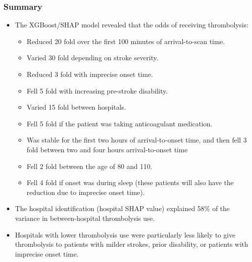 
\begin{frame}
\frametitle{Summary}
\small

\begin{itemize}
    \item The XGBoost/SHAP model revealed that the odds of receiving thrombolysis:
    
    \begin{itemize}
        \scriptsize
        \item Reduced 20 fold over the first 100 minutes of arrival-to-scan time.
        \item Varied 30 fold depending on stroke severity.
        \item Reduced 3 fold with imprecise onset time.
        \item Fell 5 fold with increasing pre-stroke disability.
        \item Varied 15 fold between hospitals. 
        \item Fell 5 fold if the patient was taking anticoagulant medication.
        \item Was stable for the first two hours of arrival-to-onset time, and then fell 3 fold between two and four hours arrival-to-onset time
        \item Fell 2 fold between the age of 80 and 110.
        \item Fell 4 fold if onset was during sleep (these patients will also have the reduction due to imprecise onset time). 
    \end{itemize}

\small
\item The hospital identification (hospital SHAP value) explained 58\% of the variance in between-hospital thrombolysis use. 

\item Hospitals with lower thrombolysis use were particularly less likely to give thrombolysis to patients with milder strokes, prior disability, or patients with imprecise onset time.

\end{itemize}

\end{frame}
